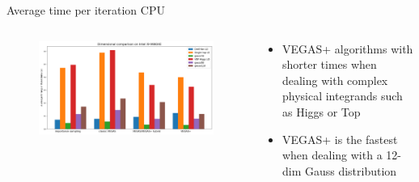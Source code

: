 \documentclass[t,handout,professionalfont,serif]{beamer}
\begin{document}
\begin{frame}{Average time per iteration CPU}
	\tiny
	\begin{columns}
		\begin{column}{0.7 \textwidth}
			\begin{figure}
									\includegraphics[width= \columnwidth]{cpu.png}
			\end{figure}

		\end{column}
	\hspace{-0.5cm}
	\begin{column}{0.3\textwidth}
					\vspace{0.7cm}
					
		\begin{itemize}

			\item VEGAS+ algorithms with shorter times when dealing with complex physical integrands such as Higgs or Top
		    \item VEGAS+ is the fastest when dealing with a 12-dim Gauss distribution
	\end{itemize}
	\end{column}
	\end{columns}


\end{frame}
\end{document}

